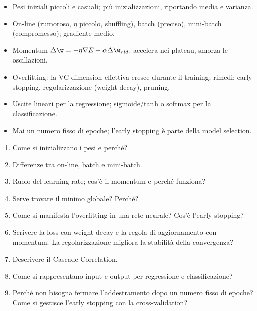 \begin{puntichiave}
\begin{itemize}
  \item Pesi iniziali piccoli e casuali; più inizializzazioni, riportando media e varianza.
  \item On-line (rumoroso, $\eta$ piccolo, shuffling), batch (preciso), mini-batch (compromesso); gradiente medio.
  \item Momentum $\Delta\w = -\eta\nabla E + \alpha\Delta\w_{\mathit{old}}$: accelera nei plateau, smorza le
        oscillazioni.
  \item Overfitting: la VC-dimension effettiva cresce durante il training; rimedi: early stopping,
        regolarizzazione (weight decay), pruning.
  \item Uscite lineari per la regressione; sigmoide/tanh o softmax per la classificazione.
  \item Mai un numero fisso di epoche; l'early stopping è parte della model selection.
\end{itemize}
\end{puntichiave}

\begin{domande}
\begin{enumerate}
  \item Come si inizializzano i pesi e perché?
  \item Differenze tra on-line, batch e mini-batch.
  \item Ruolo del learning rate; cos'è il momentum e perché funziona?
  \item Serve trovare il minimo globale? Perché?
  \item Come si manifesta l'overfitting in una rete neurale? Cos'è l'early stopping?
  \item Scrivere la loss con weight decay e la regola di aggiornamento con momentum. La regolarizzazione migliora la
        stabilità della convergenza?
  \item Descrivere il Cascade Correlation.
  \item Come si rappresentano input e output per regressione e classificazione?
  \item Perché non bisogna fermare l'addestramento dopo un numero fisso di epoche? Come si gestisce l'early stopping
        con la cross-validation?
\end{enumerate}
\end{domande}
